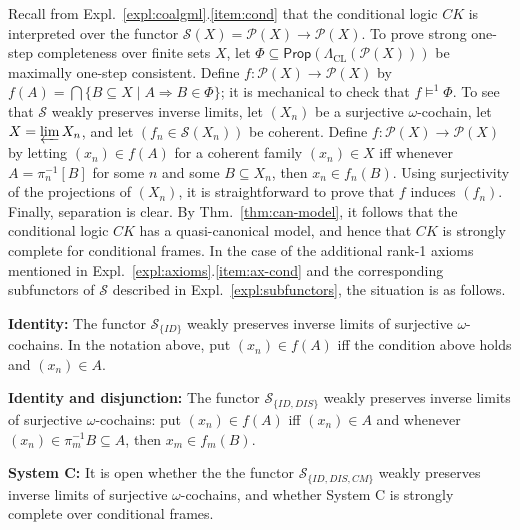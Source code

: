 \documentclass[proceedings]{stacs}
\theoremstyle{definition}
\theoremstyle{plain}
\newcommand{\mi}[1]{\mathit{#1}}
\newcommand{\Pow}{\mathcal{P}}
\newcommand{\Prop}{\mathsf{Prop}}
\newcommand{\CK}{\mathit{CK}}
\newcommand{\invlim}{\varprojlim}
\newcommand{\modelsOS}{\models^1}
\newcommand{\CondArrow}{\Rightarrow}
\newcommand{\Sel}{\mathcal{S}}
\newcommand{\CL}{\mathrm{CL}}
\begin{document}
\begin{exa}
  Recall from Expl.~\ref{expl:coalgml}.\ref{item:cond} that the
  conditional logic $\CK$ is interpreted over the functor
  $\Sel(X)=\Pow(X)\to\Pow(X)$. To prove strong one-step completeness
  over finite sets $X$, let $\Phi\subseteq\Prop(\Lambda_\CL(\Pow(X)))$
  be maximally one-step consistent. Define $f:\Pow(X)\to\Pow(X)$ by
  $f(A)=\bigcap\{B\subseteq X\mid A\CondArrow B\in\Phi\}$; it is
  mechanical to check that $f\modelsOS\Phi$. To see that $\Sel$ weakly
  preserves inverse limits, let $(X_n)$ be a surjective
  $\omega$-cochain, let $X=\invlim X_n$, and let $(f_n\in\Sel(X_n))$
  be coherent. Define $f:\Pow(X)\to\Pow(X)$ by letting $(x_n)\in f(A)$
  for a coherent family $(x_n)\in X$ iff whenever $A=\pi_n^{-1}[B]$
  for some $n$ and some $B\subseteq X_n$, then $x_n\in f_n(B)$. Using
  surjectivity of the projections of $(X_n)$, it is straightforward to
  prove that $f$ induces $(f_n)$. Finally, separation is clear. By
  Thm.~\ref{thm:can-model}, it follows that the conditional logic
  $\CK$ has a quasi-canonical model, and hence that $\CK$ is strongly
  complete for conditional frames.  In the case of the additional
  rank-1 axioms mentioned in
  Expl.~\ref{expl:axioms}.\ref{item:ax-cond} and the corresponding
  subfunctors of $\Sel$ described in Expl.~\ref{expl:subfunctors}, the
  situation is as follows.

  \textbf{Identity:} The functor $\Sel_{\{\mi{ID}\}}$ weakly preserves
  inverse limits of surjective $\omega$-cochains. In the notation
  above, put $(x_n)\in f(A)$ iff the condition above holds and
  $(x_n)\in A$.

  \textbf{Identity and disjunction:} The functor
  $\Sel_{\{\mi{ID},\mi{DIS}\}}$ weakly preserves inverse limits of
  surjective $\omega$-cochains: put $(x_n)\in f(A)$ iff $(x_n)\in A$
  and whenever $(x_n)\in\pi_m^{-1}B\subseteq A$, then $x_m\in f_m(B)$.

  \textbf{System C:} It is open whether the the functor
  $\Sel_{\{\mi{ID},\mi{DIS},\mi{CM}\}}$ weakly preserves inverse
  limits of surjective $\omega$-cochains, and whether System C is
  strongly complete over conditional frames.


\end{exa}
\end{document}
